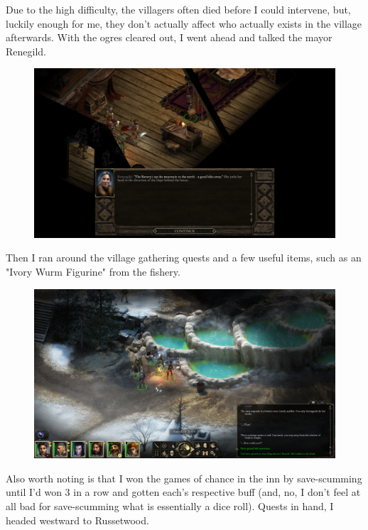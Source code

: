 \documentclass{article}
\begin{document}
Due to the high difficulty, the villagers often died before I could intervene, but, luckily enough for me, they don't actually affect who actually exists in the village afterwards.  With the ogres cleared out, I went ahead and talked the mayor Renegild.

\begin{figure}
\includegraphics[scale=0.33]{files/blog/2019_08_17_poe_potd_wmpt1/2019_08_17_stalwart_2.jpg}
\end{figure}

Then I ran around the village gathering quests and a few useful items, such as an "Ivory Wurm Figurine" from the fishery.

\begin{figure}
\includegraphics[scale=0.33]{files/blog/2019_08_17_poe_potd_wmpt1/2019_08_17_stalwart_3.jpg}
\end{figure}

Also worth noting is that I won the games of chance in the inn by save-scumming until I'd won 3 in a row and gotten each's respective buff (and, no, I don't feel at all bad for save-scumming what is essentially a dice roll).  Quests in hand, I headed westward to Russetwood.
\end{document}
